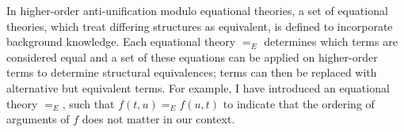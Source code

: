 %
%

In higher-order anti-unification modulo equational theories, a set of equational theories, which treat differing structures as equivalent, is defined to incorporate background knowledge. Each equational theory $=_E$ determines which terms are considered equal and a set of these equations can be applied on higher-order terms to determine structural equivalences; terms can then be replaced with alternative but equivalent terms. For example, I have introduced an equational theory $=_E$, such that $f(t,u) =_E f(u,t)$ to indicate that the ordering of arguments of $f$ does not matter in our context.

